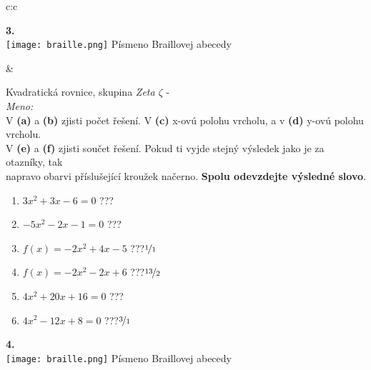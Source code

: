 \documentclass[10pt]{report}
\begin{document}
\begin{tabular}{c:c}
\begin{minipage}[c][99mm][t]{0.49\linewidth}
\begin{center}
\begin{minipage}{0.20\linewidth}
\begin{center}
{\Huge\bfseries 3.} \\[2mm]
\texttt{[image: braille.png]}
{\small Písmeno Braillovej abecedy}
\end{center}
\end{minipage}
\end{center}
\end{minipage}
&
\begin{minipage}[c][99mm][t]{0.49\linewidth}
\begin{center}
\vspace{7mm}
{\huge Kvadratická rovnice, skupina \textit{Zeta $\zeta$} -}\\[4.5mm]
\textit{Meno:}\phantom{xxxxxxxxxxxxxxxxxxxxxxxxxxxxxxxxxxxxxxxxxxxxxxxxxxxxxxxxxxxxxxxxx}\\[3.5mm]
V \textbf{(a)} a \textbf{(b)} zjisti počet řešení. V \textbf{(c)} x-ovú polohu vrcholu, a v \textbf{(d)} y-ovú polohu vrcholu.\\V \textbf{(e)} a \textbf{(f)} zjisti součet řešení. Pokud ti vyjde stejný výsledek jako je za otazníky, tak\\napravo obarvi příslušející kroužek načerno. \textbf{Spolu odevzdejte výsledné slovo}.\\[3mm]
\begin{minipage}{0.77\linewidth}
\begin{center}
\begin{varwidth}{\textwidth}
\begin{enumerate}
\large
\item $3x^2+3x-6=0$\quad \dotfill\; ???\;\dotfill {}
\item $-5x^2-2x-1=0$\quad \dotfill\; ???\;\dotfill {}
\item $f(x)=-2x^2+4x-5$\quad \dotfill\; ???\;\dotfill \quad $\nicefrac{1}{1}$
\item $f(x)=-2x^2-2x+6$\quad \dotfill\; ???\;\dotfill \quad $\nicefrac{13}{2}$
\item $4x^2+20x+16=0$\quad \dotfill\; ???\;\dotfill {}
\item $4x^2-12x+8=0$\quad \dotfill\; ???\;\dotfill \quad $\nicefrac{3}{1}$
\end{enumerate}
\end{varwidth}
\end{center}
\end{minipage}
\begin{minipage}{0.20\linewidth}
\begin{center}
{\Huge\bfseries 4.} \\[2mm]
\texttt{[image: braille.png]}
{\small Písmeno Braillovej abecedy}
\end{center}
\end{minipage}
\end{center}
\end{minipage}

\end{tabular}
\end{document}
